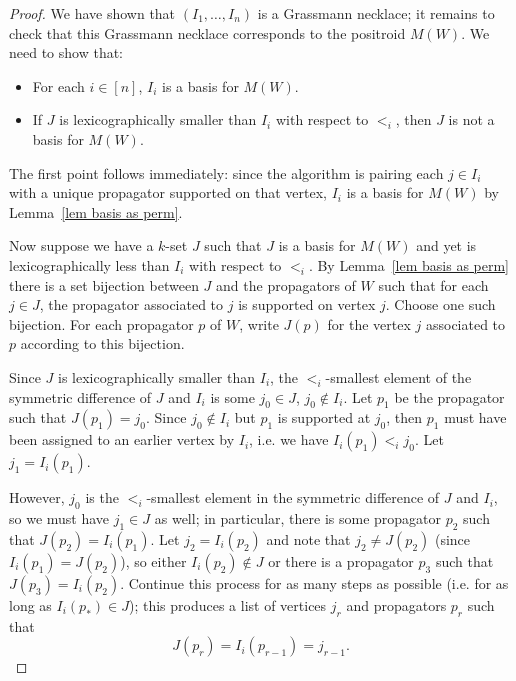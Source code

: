 \documentclass[11pt]{article}
\theoremstyle{remark}
\theoremstyle{definition}
\begin{document}
\begin{proof}
\medskip

We have shown that $(I_1,\dots,I_n)$ is a Grassmann necklace; it remains to check that this Grassmann necklace corresponds to the positroid $M(W)$.  We need to show that:
\begin{itemize}
\item For each $i \in [n]$, $I_i$ is a basis for $M(W)$.
\item If $J$ is lexicographically smaller than $I_i$ with respect to $<_i$, then $J$ is not a basis for $M(W)$.
\end{itemize}
The first point follows immediately: since the algorithm is pairing each $j \in I_i$ with a unique propagator supported on that vertex, $I_i$ is a basis for $M(W)$ by Lemma~\ref{lem basis as perm}.

Now suppose we have a $k$-set $J$ such that $J$ is a basis for $M(W)$ and yet is lexicographically less than $I_i$ with respect to $<_i$.  By Lemma~\ref{lem basis as perm} there is a set bijection between $J$ and the propagators of $W$ such that for each $j \in J$, the propagator associated to $j$ is supported on vertex $j$.  Choose one such bijection.  For each propagator $p$ of $W$, write $J(p)$ for the vertex $j$ associated to $p$ according to this bijection.

Since $J$ is lexicographically smaller than $I_i$, the $<_i$-smallest element of the symmetric difference of $J$ and $I_i$ is some $j_0\in J$, $j_0 \not\in I_i$. Let $p_1$ be the propagator such that $J(p_1)=j_0$.  Since $j_0\not\in I_i$ but $p_1$ is supported at $j_0$, then $p_1$ must have been assigned to an earlier vertex by $I_i$, i.e. we have $I_i(p_1) <_i j_0$.  Let $j_1 = I_i(p_1)$.

However, $j_0$ is the $<_i$-smallest element in the symmetric difference of $J$ and $I_i$, so we must have $j_1 \in J$ as well; in particular, there is some propagator $p_2$ such that $J(p_2)=I_i(p_1)$.  Let $j_2 = I_i(p_2)$ and note that $j_2 \neq J(p_2)$ (since $I_i(p_1)=J(p_2)$), so either $I_i(p_2) \not\in J$ or there is a propagator $p_3$ such that $J(p_3) = I_i(p_2)$. Continue this process for as many steps as possible (i.e. for as long as $I_i(p_*) \in J$); this produces a list of vertices $j_r$ and propagators $p_r$ such that 
\[J(p_r) = I_i(p_{r-1}) = j_{r-1}.\]


\end{proof}
\end{document}
